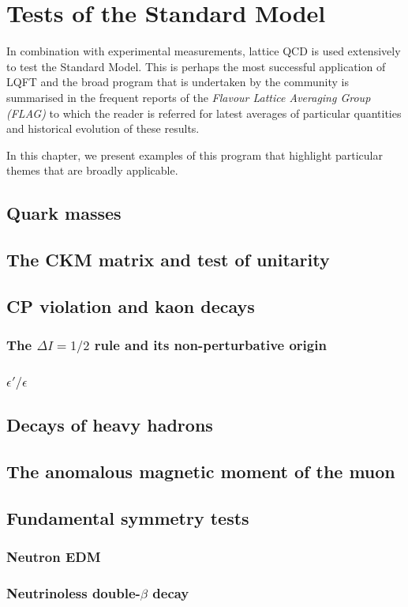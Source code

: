 \chapter{Tests of the Standard Model}

In combination with experimental measurements, lattice QCD is used extensively to test the Standard Model.
This is perhaps the most successful application of LQFT and the broad program that is undertaken by the community is summarised in the frequent reports of the  \textit{Flavour Lattice Averaging Group (FLAG)} to which the reader is referred for latest averages of particular quantities and historical evolution of these results.

In this chapter, we present examples of this  program that highlight particular themes that are broadly  applicable.


\section{Quark masses}

\section{The CKM matrix and test of unitarity}

\section{CP violation and kaon decays}

\subsection{The $\Delta I=1/2$ rule and its non-perturbative origin}

\subsection{$\epsilon'/\epsilon$}

\section{Decays of heavy hadrons}

\section{The anomalous magnetic moment of the muon}

\section{Fundamental symmetry tests}

\subsection{Neutron EDM}

\subsection{Neutrinoless double-$\beta$ decay}

